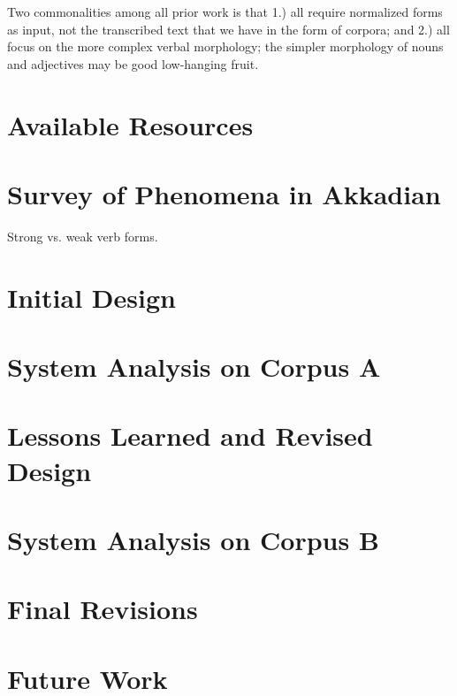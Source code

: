 \documentclass[11pt,letterpaper]{article}
\begin{document}
Two commonalities among all prior work is that 1.) all require normalized forms as input, not the transcribed text that we have in the form of corpora; and 2.) all focus on the more complex verbal morphology; the simpler morphology of nouns and adjectives may be good low-hanging fruit.

\section{Available Resources}

\section{Survey of Phenomena in Akkadian}

Strong vs. weak verb forms.

\section{Initial Design}

\section{System Analysis on Corpus A}

\section{Lessons Learned and Revised Design}

\section{System Analysis on Corpus B}

\section{Final Revisions}

\section{Future Work}


\nocite{*}




\label{lastpage}
\end{document}
